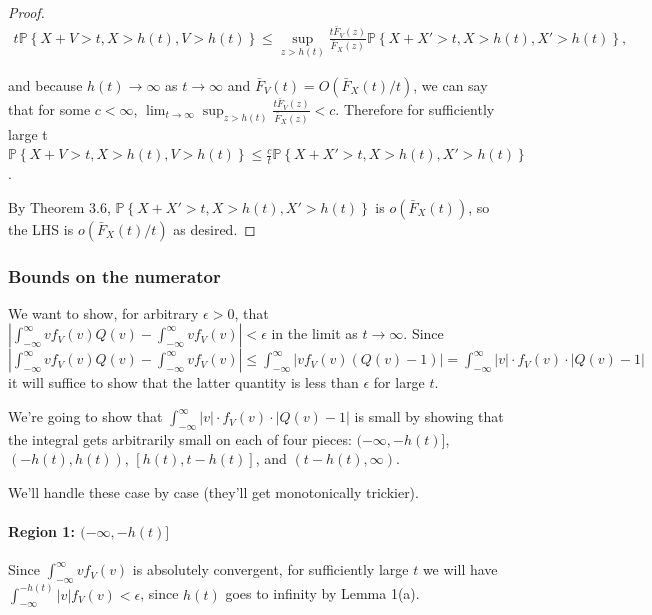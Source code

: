 \documentclass[../neurips_2024.tex]{subfiles}
\begin{document}
\begin{proof}
\begin{multline} t \mathbb{P}\left\{X\!+\!V>t, X\!>\!h(t), V\!>\!h(t) \right\} \le \sup_{z > h(t)} \frac{t\bar F_V(z)}{\bar F_X(z)} {\mathbb{P}\left\{X\!+\!X'>t, X\!>\!h(t), X'\!>\!h(t)\right\}}, \end{multline}

and because \(h(t) \to\infty\) as \(t \to\infty\) and \(\bar F_V(t) = O(\bar F_X(t) / t)\), we can say that for some \(c < \infty\), \(\lim_{t \to\infty} \sup_{z > h(t)} \frac{t\bar F_V(z)}{\bar F_X(z)} < c\). Therefore for sufficiently large t \(\mathbb{P}\left\{X+V>t, X>h(t), V>h(t) \right\} \leq \frac c t {\mathbb{P}\left\{X\!+\!X'>t, X\!>\!h(t), X'\!>\!h(t)\right\}}\). 

By Theorem 3.6, \(\mathbb{P}\left\{X\!+\!X'>t, X\!>\!h(t), X'\!>\!h(t)\right\}\) is \(o(\bar F_X(t))\), so the LHS is \(o(\bar F_X(t)/t)\) as desired.
\end{proof}

\subsubsection{Bounds on the numerator}

We want to show, for arbitrary \(\epsilon>0\), that \(\left|\int_{-\infty}^\infty vf_V(v)Q(v) - \int_{-\infty}^\infty vf_V(v)\right|<\epsilon\) in the limit as \(t\to\infty\). Since \(\left|\int_{-\infty}^\infty vf_V(v)Q(v) - \int_{-\infty}^\infty vf_V(v)\right| \le \int_{-\infty}^\infty \left|vf_V(v)(Q(v) - 1)\right| = \int_{-\infty}^\infty |v| \cdot f_V(v) \cdot |Q(v) - 1|\) it will suffice to show that the latter quantity is less than \(\epsilon\) for large \(t\).

We're going to show that \(\int_{-\infty}^\infty |v|\cdot f_V(v)\cdot |Q(v) - 1|\) is small by showing that the integral gets arbitrarily small on each of four pieces: \((-\infty,-h(t)]\), \((-h(t),h(t))\), \([h(t),t-h(t)]\), and \((t-h(t),\infty)\).

We'll handle these case by case (they'll get monotonically trickier).

\paragraph{Region 1: \texorpdfstring{\((-\infty,-h(t)]\)}{}}
 Since \(\int_{-\infty}^\infty vf_V(v)\) is absolutely convergent, for sufficiently large \(t\) we will have \(\int_{-\infty}^{-h(t)} |v|f_V(v) < \epsilon\), since \(h(t)\) goes to infinity by Lemma 1(a).
\end{document}
